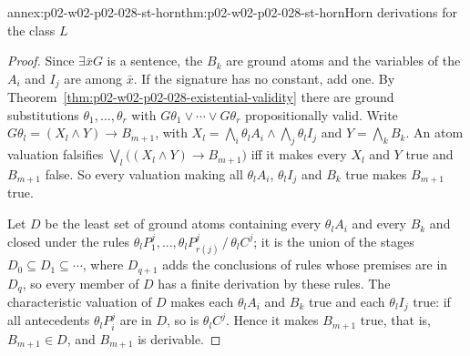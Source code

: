 \begin{annexitem}{annex:p02-w02-p02-028-st-horn}{thm:p02-w02-p02-028-st-horn}{Horn derivations for the class \(L\)}
\begin{proof}
Since \(\exists\bar xG\) is a sentence, the \(B_k\) are ground atoms and the
variables of the \(A_i\) and \(I_j\) are among \(\bar x\).  If the signature
has no constant, add one.  By
Theorem~\ref{thm:p02-w02-p02-028-existential-validity} there are ground
substitutions \(\theta_1,\ldots,\theta_r\) with
\(G\theta_1\lor\cdots\lor G\theta_r\) propositionally valid.  Write
\(G\theta_l=(X_l\land Y)\to B_{m+1}\), with
\(X_l=\bigwedge_i\theta_lA_i\land\bigwedge_j\theta_lI_j\) and
\(Y=\bigwedge_kB_k\).  An atom valuation falsifies
\(\bigvee_l\bigl((X_l\land Y)\to B_{m+1}\bigr)\) iff it makes every \(X_l\)
and \(Y\) true and \(B_{m+1}\) false.  So every valuation making all
\(\theta_lA_i\), \(\theta_lI_j\) and \(B_k\) true makes \(B_{m+1}\) true.

Let \(D\) be the least set of ground atoms containing every \(\theta_lA_i\)
and every \(B_k\) and closed under the rules
\(\theta_lP^j_1,\ldots,\theta_lP^j_{r(j)}\,/\,\theta_lC^j\); it is the union of
the stages \(D_0\subseteq D_1\subseteq\cdots\), where \(D_{q+1}\) adds the
conclusions of rules whose premises are in \(D_q\), so every member of \(D\)
has a finite derivation by these rules.  The characteristic valuation of
\(D\) makes each \(\theta_lA_i\) and \(B_k\) true and each \(\theta_lI_j\)
true: if all antecedents \(\theta_lP^j_i\) are in \(D\), so is
\(\theta_lC^j\).  Hence it makes \(B_{m+1}\) true, that is,
\(B_{m+1}\in D\), and \(B_{m+1}\) is derivable.
\end{proof}
\end{annexitem}

